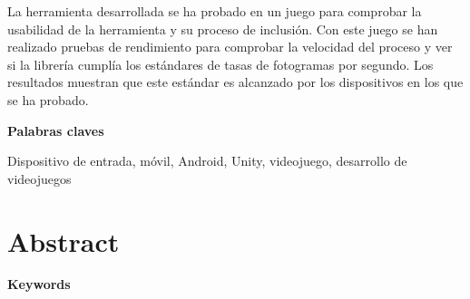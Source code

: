 La herramienta desarrollada se ha probado en un juego para comprobar la usabilidad de la herramienta y su proceso de inclusi\'on. Con este juego se han realizado pruebas de rendimiento para comprobar la velocidad del proceso y ver si la librer\'ia cumpl\'ia los est\'andares de tasas de fotogramas por segundo. Los resultados muestran que este est\'andar es alcanzado por los dispositivos en los que se ha probado.

\addvspace{1cm}


\Large{\textbf{Palabras claves}}
\normalsize

\addvspace{1cm}

Dispositivo de entrada, m\'ovil, Android, Unity, videojuego, desarrollo de videojuegos


\chapter{Abstract}

\huge{\textbf{Keywords}}
\normalsize
\endinput
